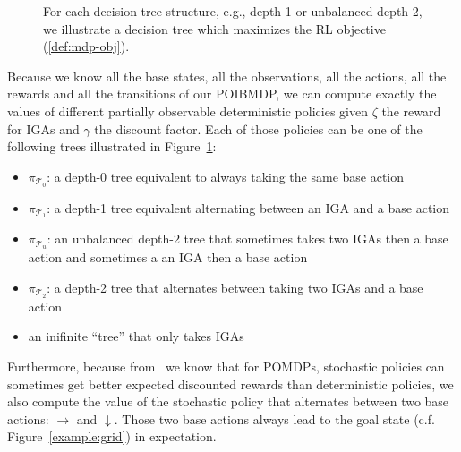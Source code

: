 \begin{figure}[htbp]
    \caption{For each decision tree structure, e.g., depth-1 or unbalanced depth-2, we illustrate a decision tree which maximizes the RL objective (\ref{def:mdp-obj}).}
    \label{fig:optimal-policy-trees}
\end{figure}

Because we know all the base states, all the observations, all the actions, all the rewards and all the transitions of our POIBMDP, we can compute exactly the values of different partially observable deterministic policies given $\zeta$ the reward for IGAs and $\gamma$ the discount factor.
Each of those policies can be one of the following trees illustrated in Figure~\ref{fig:optimal-policy-trees}: 

\begin{itemize}
    \item $\pi_{\mathcal{T}_0}$: a depth-0 tree equivalent to always taking the same base action 
    \item $\pi_{\mathcal{T}_1}$: a depth-1 tree equivalent alternating between an IGA and a base action 
    \item $\pi_{\mathcal{T}_u}$: an unbalanced depth-2 tree that sometimes takes two IGAs then a base action and sometimes a an IGA then a base action
    \item $\pi_{\mathcal{T}_2}$: a depth-2 tree that alternates between taking two IGAs and a base action
    \item an inifinite ``tree'' that only takes IGAs
\end{itemize}
Furthermore, because from~\cite{learning-pomdp} we know that for POMDPs, stochastic policies can sometimes get better expected discounted rewards than deterministic policies, we also compute the value of the stochastic policy that alternates between two base actions: $\rightarrow$ and $\downarrow$.
Those two base actions always lead to the goal state (c.f. Figure~\ref{example:grid}) in expectation.

